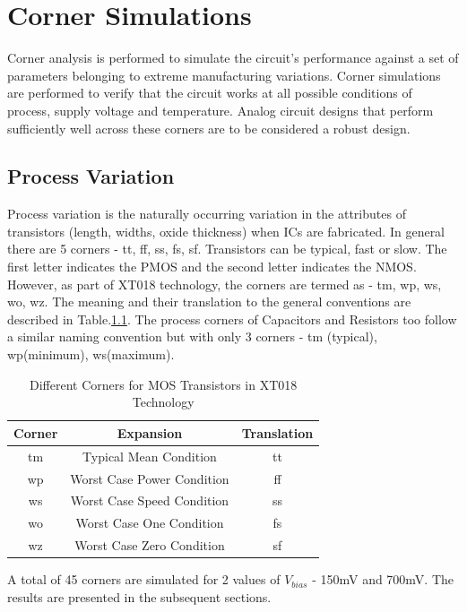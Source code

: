 \chapter{Corner Simulations}
Corner analysis is performed to simulate the circuit's performance against a set of parameters belonging to extreme manufacturing variations. Corner simulations are performed to verify that the circuit works at all possible conditions of process, supply voltage and temperature. Analog circuit designs that perform sufficiently well across these corners are to be considered a robust design.

\section{Process Variation}

Process variation is the naturally occurring variation in the attributes of transistors (length, widths, oxide thickness) when ICs are fabricated. In general there are 5 corners - tt, ff, ss, fs, sf. Transistors can be typical, fast or slow. The first letter indicates the PMOS and the second letter indicates the NMOS. However, as part of XT018 technology, the corners are termed as - tm, wp, ws, wo, wz. The meaning and their translation to the general conventions are described in Table.\ref{tab:Process_Corners}. The process corners of Capacitors and Resistors too follow a similar naming convention but with only 3 corners - tm (typical), wp(minimum), ws(maximum).

\begin{table} [H]
\centering
\begin{tabular}{@{}ccc@{}}
\toprule
Corner	& Expansion						& Translation	\\ \midrule
tm		& Typical Mean Condition 		& tt			\\
wp		& Worst Case Power Condition	& ff			\\
ws		& Worst Case Speed Condition 	& ss			\\
wo		& Worst Case One Condition 		& fs			\\
wz		& Worst Case Zero Condition 	& sf			\\
\bottomrule
\end{tabular}
\caption{Different Corners for MOS Transistors in XT018 Technology}
\label{tab:Process_Corners}
\end{table}

A total of 45 corners are simulated for 2 values of $V_{bias}$ - 150mV and 700mV. The results are presented in the subsequent sections.

